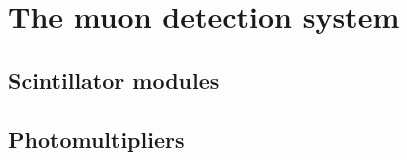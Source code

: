 
\chapter{The muon detection system}
\label{ch:Content1}


  \section{Scintillator modules}
  \label{ch:Content1:sec:Scintillator modules}

  \section{Photomultipliers}
  \label{ch:Content1:sec:Photomultipliers}

